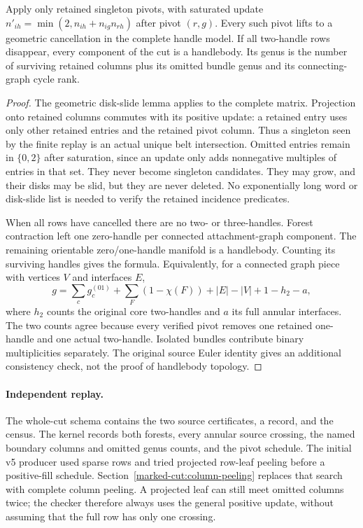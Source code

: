 \begin{proposition}
\label{marked-cut:kernel-census}
Apply only retained singleton pivots, with saturated update
$n'_{ih}=\min(2,n_{ih}+n_{ig}n_{rh})$ after pivot $(r,g)$.
Every such pivot lifts to a geometric cancellation in the complete handle
model. If all two-handle rows disappear, every component of the cut is a
handlebody. Its genus is the number of surviving retained columns plus its
omitted bundle genus and its connecting-graph cycle rank.
\end{proposition}
\begin{proof}
The geometric disk-slide lemma applies to the complete matrix. Projection
onto retained columns commutes with its positive update: a retained entry
uses only other retained entries and the retained pivot column. Thus a
singleton seen by the finite replay is an actual unique belt intersection.
Omitted entries remain in $\{0,2\}$ after saturation, since an update only
adds nonnegative multiples of entries in that set. They never become
singleton candidates. They may grow, and their disks may be slid, but they
are never deleted. No exponentially long word or disk-slide list is needed
to verify the retained incidence predicates.

When all rows have cancelled there are no two- or three-handles. Forest
contraction left one zero-handle per connected attachment-graph component.
The remaining orientable zero/one-handle manifold is a handlebody. Counting
its surviving handles gives the formula. Equivalently, for a connected
graph piece with vertices $V$ and interfaces $E$,
\[
 g=\sum_{c}g_c^{(01)}+\sum_F(1-\chi(F))
       +|E|-|V|+1-h_2-a,
\]
where $h_2$ counts the original core two-handles and $a$ its full annular
interfaces. The two counts agree because every verified pivot removes one
retained one-handle and one actual two-handle. Isolated bundles contribute
binary multiplicities separately. The original source Euler identity gives
an additional consistency check, not the proof of handlebody topology.
\end{proof}

\paragraph{Independent replay.}
The whole-cut schema  contains the two
source certificates, a  record, and the
census. The kernel records both forests, every annular source crossing,
the named boundary columns and omitted genus counts, and the pivot schedule.
The initial v5 producer used sparse rows and tried projected row-leaf
peeling before a positive-fill schedule. Section~\ref{marked-cut:column-peeling}
replaces that search with complete column peeling. A projected leaf can still meet omitted
columns twice; the checker therefore always uses the general positive
update, without assuming that the full row has only one crossing.

